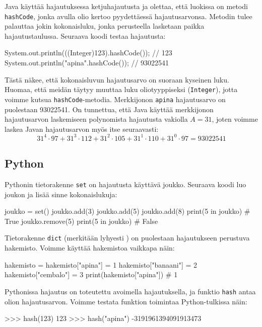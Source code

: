 Java käyttää hajautuksessa ketjuhajautusta ja olettaa,
että luokissa on metodi \texttt{hashCode},
jonka avulla olio kertoo pyydettäessä hajautusarvonsa.
Metodin tulee palauttaa jokin kokonaisluku, jonka perusteella
lasketaan paikka hajautustaulussa. Seuraava koodi testaa hajautusta:

\begin{code}
System.out.println(((Integer)123).hashCode()); // 123
System.out.println("apina".hashCode()); // 93022541
\end{code}

Tästä näkee, että kokonaisluvun hajautusarvo on suoraan
kyseinen luku.
Huomaa, että meidän täytyy muuttaa luku oliotyyppiseksi
(\texttt{Integer}), jotta voimme kutsua \texttt{hashCode}-metodia.
Merkkijonon \texttt{apina} hajautusarvo on puolestaan 93022541.
On tunnettua, että Java käyttää merkkijonon hajautusarvon laskemiseen
polynomista hajautusta vakiolla $A=31$,
joten voimme laskea Javan hajautusarvon myös itse seuraavasti:
\[31^4 \cdot 97+31^3 \cdot 112+31^2 \cdot 105+31^1 \cdot 110+31^0 \cdot 97=93022541\]

\subsection{Python}

Pythonin tietorakenne \texttt{set} on hajautusta käyttävä joukko.
Seuraava koodi luo joukon ja lisää sinne kokonaislukuja:

\begin{code}
joukko = set()
joukko.add(3)
joukko.add(5)
joukko.add(8)
print(5 in joukko) # True
joukko.remove(5)
print(5 in joukko) # False
\end{code}

Tietorakenne \texttt{dict} (merkitään lyhyesti \texttt{\string{\string}})
on puolestaan hajautukseen perustuva hakemisto.
Voimme käyttää hakemistoa vaikkapa näin:

\begin{code}
hakemisto = {}
hakemisto["apina"] = 1
hakemisto["banaani"] = 2
hakemisto["cembalo"] = 3
print(hakemisto["apina"]) # 1
\end{code}

Pythonissa hajautus on toteutettu avoimella hajautuksella,
ja funktio \texttt{hash} antaa olion hajautusarvon.
Voimme testata funktion toimintaa Python-tulkissa näin:

\begin{code}
>>> hash(123)
123
>>> hash("apina")
-3191961394091913473
\end{code}

